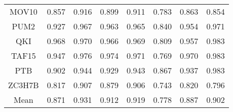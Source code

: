 \documentclass[twoside,twocolumn]{article}
\begin{document}
\begin{table*}
\begin{tabular}{c|ccccccc}
  MOV10    & 0.857 & 0.916 & 0.899 & 0.911 & 0.783 & 0.863 & 0.854 \\
  PUM2     & 0.927 & 0.967 & 0.963 & 0.965 & 0.840 & 0.954 & 0.971 \\
  QKI      & 0.968 & 0.970 & 0.966 & 0.969 & 0.809 & 0.957 & 0.983 \\
  TAF15    & 0.947 & 0.976 & 0.974 & 0.971 & 0.769 & 0.970 & 0.983 \\
  PTB      & 0.902 & 0.944 & 0.929 & 0.943 & 0.867 & 0.937 & 0.983 \\
  ZC3H7B   & 0.817 & 0.907 & 0.879 & 0.906 & 0.743 & 0.820 & 0.796 \\
  Mean     & 0.871 & 0.931 & 0.912 & 0.919 & 0.778 & 0.887 & 0.902 \\
  \bottomrule
  \end{tabular}
\end{table*}
  
\end{document}
